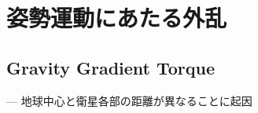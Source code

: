 \documentclass[class=article, crop=false, preview=false, dvipdfmx, a4paper]{standalone}
\begin{document}
\section{姿勢運動にあたる外乱}
\subsection{Gravity Gradient Torque}
\qquad\qquad --- 地球中心と衛星各部の距離が異なることに起因
\end{document}
